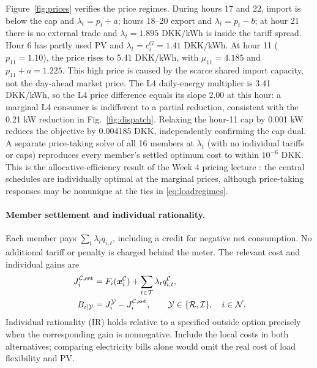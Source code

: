 \documentclass[10pt,a4paper]{article}
\newcommand{\Rmod}{\mathcal R}
\newcommand{\Imod}{\mathcal I}
\newcommand{\Cmod}{\mathcal C}
\begin{document}
Figure~\ref{fig:prices} verifies the price regimes. During hours 17 and 22, import is below the cap and $\lambda_t=p_t+a$; hours 18--20 export and $\lambda_t=p_t-b$; at hour 21 there is no external trade and $\lambda_t=1.895$ DKK/kWh is inside the tariff spread. Hour 6 has partly used PV and \(\lambda_t=c_i^G=1.41\) DKK/kWh. At hour 11 ($p_{11}=1.10$), the price rises to 5.41 DKK/kWh, with $\mu_{11}=4.185$ and $p_{11}+a=1.225$. This high price is caused by the scarce shared import capacity, not the day-ahead market price. The L4 daily-energy multiplier is 3.41 DKK/kWh, so the L4 price difference equals its slope 2.00 at this hour: a marginal L4 consumer is indifferent to a partial reduction, consistent with the 0.21 kW reduction in Fig.~\ref{fig:dispatch}. Relaxing the hour-11 cap by 0.001 kW reduces the objective by 0.004185 DKK, independently confirming the cap dual. A separate price-taking solve of all 16 members at $\lambda_t$ (with no individual tariffs or caps) reproduces every member's settled optimum cost to within $10^{-6}$ DKK. This is the allocative-efficiency result of the Week 4 pricing lecture \cite{week4}: the central schedules are individually optimal at the marginal prices, although price-taking responses may be nonunique at the ties in \eqref{eq:loadregimes}.

\paragraph{Member settlement and individual rationality.} Each member pays $\sum_t\lambda_t q_{i,t}$, including a credit for negative net consumption. No additional tariff or penalty is charged behind the meter. The relevant cost and individual gains are
\begin{align}
J_i^{\Cmod,\rm set}&=F_i(\bm x_i^{\Cmod})+\sum_{t\in\mathcal T}\lambda_t q_{i,t}^{\Cmod},\label{eq:membercost}\\
B_{i|\mathcal Y}&=J_i^{\mathcal Y}-J_i^{\Cmod,\rm set},
\qquad \mathcal Y\in\{\Rmod,\Imod\},\quad i\in\mathcal N.\label{eq:individualbenefit}
\end{align}
Individual rationality (IR) holds relative to a specified outside option precisely when the corresponding gain is nonnegative. Include the local costs in both alternatives; comparing electricity bills alone would omit the real cost of load flexibility and PV.
\end{document}
